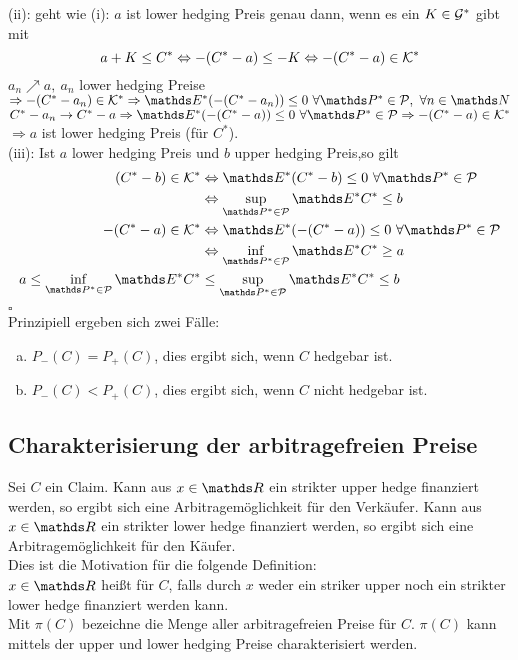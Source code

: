 (ii): geht wie (i): $a$ ist lower hedging Preis genau dann, wenn es ein $K\in \mathcal{G}^*$ gibt mit
\[
a+K\le C^* \Leftrightarrow -(C^*-a)\le-K \Leftrightarrow -(C^*-a)\in \mathcal{K}^*
\]
$a_n \nearrow a,~a_n$ lower hedging Preise $\Rightarrow -(C^*-a_n)\in\mc{K}^*\Rightarrow\E^*(-(C^*-a_n))\le 0~\forall\Pw^*\in\mc{P},~\forall n\in\N$\\
$C^*-a_n\to C^*-a\Rightarrow\E^*(-(C^*-a))\le0~\forall \Pw^*\in\mc{P}\Rightarrow-(C^*-a)\in\mc{K}^*$\\
$\Rightarrow a$ ist lower hedging Preis (für $C^*$).\\

(iii): Ist $a$ lower hedging Preis und $b$ upper hedging Preis,so gilt
\begin{equation*}
\begin{aligned}
	(C^*-b)\in \mc{K}^* &\Leftrightarrow \E^*(C^*-b)\le 0 ~\forall \Pw^*\in\mc{P}\\
	&\Leftrightarrow \sup\limits_{\Pw^*\in\mc{P}} \E^*C^*\le b\\
	-(C^*-a)\in\mc{K}^* &\Leftrightarrow \E^*(-(C^*-a))\le 0~\forall\Pw^*\in\mc{P}\\
	&\Leftrightarrow \inf\limits_{\Pw^*\in\mc{P}}\E^*C^*\ge a\\
	a\le \inf\limits_{\Pw^*\in\mc{P}}\E^*C^* &\le \sup\limits_{\Pw^*\in\mc{P}} \E^*C^* \le b
\end{aligned}
\end{equation*}
\hfill $\square$\\
Prinzipiell ergeben sich zwei Fälle:
\begin{enumerate}[(a)]
	\item $P_-(C)=P_+(C)$, dies ergibt sich, wenn $C$ hedgebar ist.
	\item $P_-(C)<P_+(C)$, dies ergibt sich, wenn $C$ nicht hedgebar ist.
\end{enumerate}


\subsection{Charakterisierung der arbitragefreien Preise}
\label{sub:arbitragefreier_preis}
Sei $C$ ein Claim.
Kann aus $x\in \R$ ein strikter upper hedge finanziert werden, so ergibt sich eine Arbitragemöglichkeit für den Verkäufer.
Kann aus $x\in\R$ ein strikter lower hedge finanziert werden, so ergibt sich eine Arbitragemöglichkeit für den Käufer.\\
Dies ist die Motivation für die folgende Definition:\\
$x\in \R$ heißt  für $C$, falls durch $x$ weder ein striker upper noch ein strikter lower hedge finanziert werden kann.\\
Mit $\pi(C)$ bezeichne die Menge aller arbitragefreien Preise für $C$.
$\pi(C)$ kann mittels der upper und lower hedging Preise charakterisiert werden.

